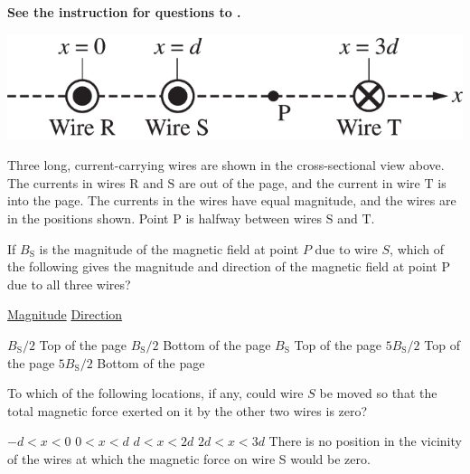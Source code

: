 
\textbf{See the instruction for questions  to .} 

\begin{center}
    \includegraphics[scale=0.3]{images/img-013-025.png}
\end{center}

Three long, current-carrying wires are shown in the cross-sectional view above. The currents in wires $\mathrm{R}$ and $\mathrm{S}$ are out of the page, and the current in wire $\mathrm{T}$ is into the page. The currents in the wires have equal magnitude, and the wires are in the positions shown. Point $\mathrm{P}$ is halfway between wires $\mathrm{S}$ and $\mathrm{T}$.

\begin{questions}
\setcounter{question}{26}

\question
If $B_{\mathrm{S}}$ is the magnitude of the magnetic field at point $P$ due to wire $S$, which of the following gives the magnitude and direction of the magnetic field at point P due to all three wires?

\tabto{0.75cm} \underline{Magnitude}
\tabto{4.00cm} \underline{Direction}

\begin{choices}
    \choice $B_{\mathrm{S}} / 2$   \tabto{3.25cm} Top of the page 
    \choice $B_{\mathrm{S}} / 2$   \tabto{3.25cm} Bottom of the page 
    \choice $B_{\mathrm{S}}$       \tabto{3.25cm} Top of the page 
    \choice $5 B_{\mathrm{S}} / 2$ \tabto{3.25cm} Top of the page 
    \choice $5 B_{\mathrm{S}} / 2$ \tabto{3.25cm} Bottom of the page 
\end{choices}

\question
To which of the following locations, if any, could wire $S$ be moved so that the total magnetic force exerted on it by the other two wires is zero?

\begin{choices}
    \choice $-d < x < 0$ 
    \choice $0 < x < d$ 
    \choice $d < x < 2d$ 
    \choice $2d < x < 3d$
    \choice There is no position in the vicinity of the wires at which the magnetic force on wire S would be zero.
\end{choices}

\end{questions}
